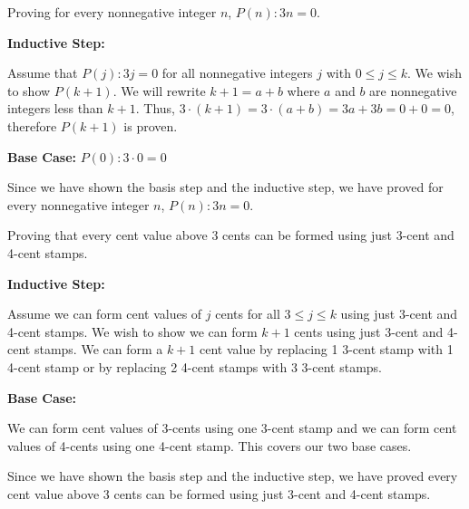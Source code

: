 \documentclass[12pt]{exam}
\begin{document}
\begin{qparts}
    \item Proving for every nonnegative integer $n$, $P(n)\colon 3n = 0$.
    
    \textbf{Inductive Step:}
    
    Assume that $P(j)\colon 3j = 0$ for all nonnegative integers $j$ with $0 \leq j \leq k$. We wish to show $P(k+1)$. We will rewrite $k+1 = a + b$ where $a$ and $b$ are nonnegative integers less than $k+1$. Thus, $3 \cdot (k+1) = 3 \cdot (a+b) = 3a + 3b = 0 + 0 = 0$, therefore $P(k+1)$ is proven.
    
    \textbf{Base Case:} $P(0)\colon 3 \cdot 0 = 0$
    
    Since we have shown the basis step and the inductive step, we have proved for every nonnegative integer $n$, $P(n): 3n = 0$.
    
    \item Proving that every cent value above 3 cents can be formed using just 3-cent and 4-cent stamps.
    
    \textbf{Inductive Step:}
    
    Assume we can form cent values of $j$ cents for all $3 \leq j \leq k$ using just 3-cent and 4-cent stamps. We wish to show we can form $k+1$ cents using just 3-cent and 4-cent stamps. We can form a $k+1$ cent value by replacing 1 3-cent stamp with 1 4-cent stamp or by replacing 2 4-cent stamps with 3 3-cent stamps.
    
    \textbf{Base Case:}
    
    We can form cent values of 3-cents using one 3-cent stamp and we can form cent values of 4-cents using one 4-cent stamp. This covers our two base cases.
    
    Since we have shown the basis step and the inductive step, we have proved every cent value above 3 cents can be formed using just 3-cent and 4-cent stamps.
\end{qparts}

\begin{solution}

\end{solution}
\end{document}
